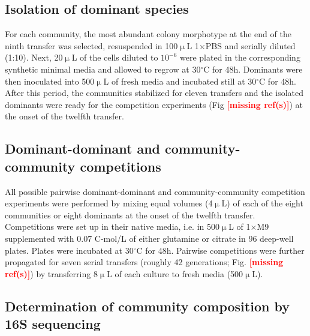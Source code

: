 \documentclass[a4paper,10pt]{article}
\newcommand{\mr}{\textcolor{red}{\textbf{[missing ref(s)]}}}
\begin{document}
\subsection*{Isolation of dominant species}\label{methods:dominants}

For each community, the most abundant colony morphotype at the end of the ninth transfer
was selected, resuspended in 100$\upmu$L 1$\times$PBS and serially diluted (1:10).
Next, 20$\upmu$L of the cells diluted to $10^{-6}$ were plated in the corresponding synthetic
minimal media and allowed to regrow at 30$^\circ$C for 48h. Dominants were then inoculated
into 500$\upmu$L of fresh media and incubated still at 30$^\circ$C for 48h.
After this period, the communities stabilized for eleven transfers and the isolated dominants
were ready for the competition experiments (Fig \mr) at the onset of the twelfth transfer.

\subsection*{Dominant-dominant and community-community competitions}
\label{methods:competitions}

All possible pairwise dominant-dominant and community-community
competition experiments
were performed by mixing equal volumes (4$\upmu$L) of each of the eight
communities or eight dominants at the onset of the twelfth transfer.
Competitions were set up in their native media,
i.e. in 500$\upmu$L of 1$\times$M9 supplemented with 0.07 C-mol/L of
either glutamine or citrate in 96 deep-well plates.
Plates were incubated at 30$^\circ$C for 48h.
Pairwise competitions were further propagated for seven serial transfers
(roughly 42 generations; Fig. \mr) by transferring 8$\upmu$L of
each culture to fresh media (500$\upmu$L).

\subsection*{Determination of community composition by 16S sequencing}
\label{methods:sequencing}
\end{document}
